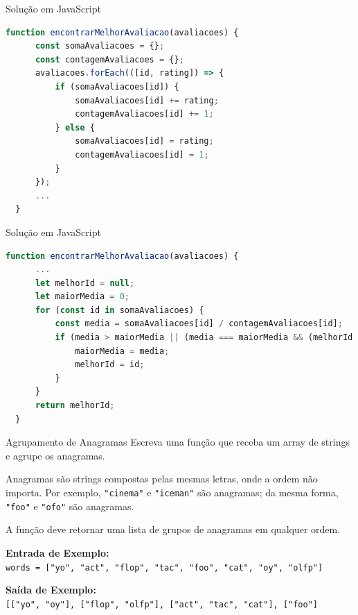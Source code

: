 \begin{frame}[fragile]{Solução em JavaScript}
  \begin{lstlisting}[language=JavaScript]
  function encontrarMelhorAvaliacao(avaliacoes) {
      const somaAvaliacoes = {};
      const contagemAvaliacoes = {};
      avaliacoes.forEach(([id, rating]) => {
          if (somaAvaliacoes[id]) {
              somaAvaliacoes[id] += rating;
              contagemAvaliacoes[id] += 1;
          } else {
              somaAvaliacoes[id] = rating;
              contagemAvaliacoes[id] = 1;
          }
      });
      ...
  }
  \end{lstlisting}
\end{frame}
\begin{frame}[fragile]{Solução em JavaScript}
  \begin{lstlisting}[language=JavaScript]
  function encontrarMelhorAvaliacao(avaliacoes) {
      ...
      let melhorId = null;
      let maiorMedia = 0;
      for (const id in somaAvaliacoes) {
          const media = somaAvaliacoes[id] / contagemAvaliacoes[id];
          if (media > maiorMedia || (media === maiorMedia && (melhorId === null || parseInt(id) < melhorId))) {
              maiorMedia = media;
              melhorId = id;
          }
      }
      return melhorId;
  }
  \end{lstlisting}
  \end{frame}
  
\begin{frame}[fragile]{Agrupamento de Anagramas}
  Escreva uma função que receba um array de strings e agrupe os anagramas.
  
  Anagramas são strings compostas pelas mesmas letras, onde a ordem não importa. Por exemplo, \texttt{"cinema"} e \texttt{"iceman"} são anagramas; da mesma forma, \texttt{"foo"} e \texttt{"ofo"} são anagramas.
  
  A função deve retornar uma lista de grupos de anagramas em qualquer ordem.

  \textbf{Entrada de Exemplo:}\\
  \texttt{words = ["yo", "act", "flop", "tac", "foo", "cat", "oy", "olfp"]}

  \textbf{Saída de Exemplo:}\\
  \texttt{{[["yo", "oy"], ["flop", "olfp"], ["act", "tac", "cat"], ["foo"]}}
\end{frame}
  